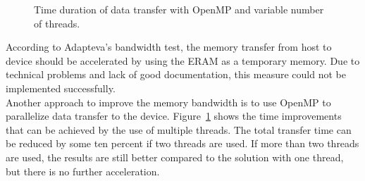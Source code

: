 \documentclass[american, hauptseminar, twoside]{zihpub}
\begin{document}
						\begin{figure}[H]
							\centering
							\caption{Time duration of data transfer with OpenMP and variable number of threads.}
							\label{fig:omp}
						\end{figure}
						According to Adapteva's bandwidth test, the memory transfer from host to device should be accelerated by using the ERAM as a temporary memory. Due to technical problems and lack of good documentation, this measure could not be implemented successfully.  
						\\
						Another approach to improve the memory bandwidth is to use OpenMP to parallelize data transfer to the device. Figure~\ref{fig:omp} shows the time improvements that can be achieved by the use of multiple threads. The total transfer time can be reduced by some ten percent if two threads are used. If more than two threads are used, the results are still better compared to the solution with one thread, but there is no further acceleration. 
\end{document}
